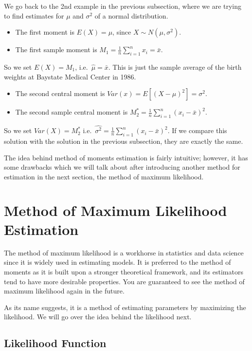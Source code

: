 \documentclass[
]{book}
\providecommand{\tightlist}{%
  \setlength{\itemsep}{0pt}\setlength{\parskip}{0pt}}
\begin{document}
We go back to the 2nd example in the previous subsection, where we are trying to find estimates for \(\mu\) and \(\sigma^2\) of a normal distribution.

\begin{itemize}
\tightlist
\item
  The first moment is \(E(X) = \mu\), since \(X \sim N(\mu, \sigma^2)\).
\item
  The first sample moment is \(M_1 = \frac{1}{n} \sum_{i=1}^n x_i = \bar{x}\).
\end{itemize}

So we set \(E(X) = M_1\), i.e.~\(\hat{\mu} = \bar{x}\). This is just the sample average of the birth weights at Baystate Medical Center in 1986.

\begin{itemize}
\tightlist
\item
  The second central moment is \(Var(x) = E[(X-\mu)^2] = \sigma^2\).
\item
  The second sample central moment is \(M_2^* = \frac{1}{n} \sum_{i=1}^n (x_i - \bar{x})^2\).
\end{itemize}

So we set \(Var(X) = M_2^*\) i.e.~\(\hat{\sigma^2} = \frac{1}{n} \sum_{i=1}^n (x_i - \bar{x})^2\). If we compare this solution with the solution in the previous subsection, they are exactly the same.

The idea behind method of moments estimation is fairly intuitive; however, it has some drawbacks which we will talk about after introducing another method for estimation in the next section, the method of maximum likelihood.

\hypertarget{MLE}{%
\section{Method of Maximum Likelihood Estimation}\label{MLE}}

The method of maximum likelihood is a workhorse in statistics and data science since it is widely used in estimating models. It is preferred to the method of moments as it is built upon a stronger theoretical framework, and its estimators tend to have more desirable properties. You are guaranteed to see the method of maximum likelihood again in the future.

As its name suggests, it is a method of estimating parameters by maximizing the likelihood. We will go over the idea behind the likelihood next.

\hypertarget{likelihood-function}{%
\subsection{Likelihood Function}\label{likelihood-function}}
\end{document}
